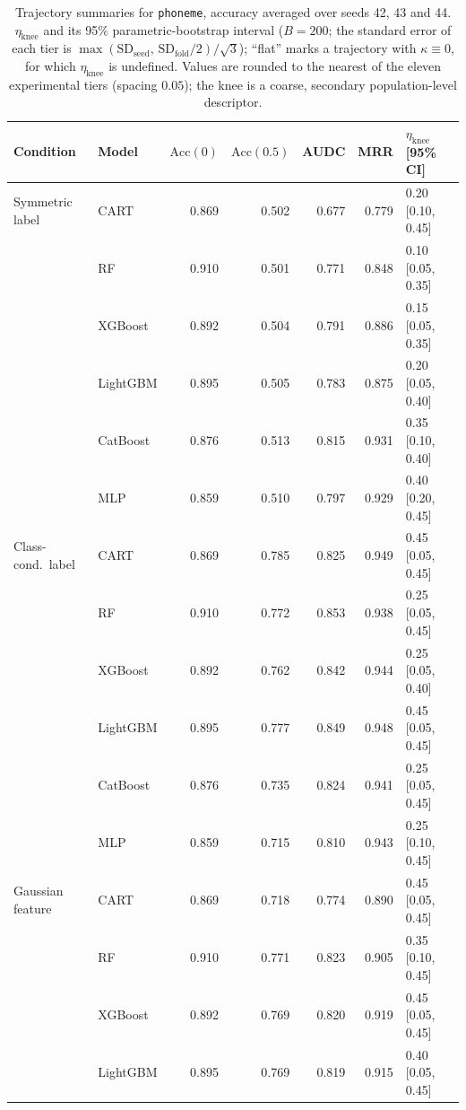 \begin{table}[p]
\centering
\scriptsize
\setlength{\tabcolsep}{3.5pt}
\caption{Trajectory summaries for \texttt{phoneme}, accuracy averaged over seeds 42, 43 and 44. $\eta_{\mathrm{knee}}$ and its 95\% parametric-bootstrap interval ($B=200$; the standard error of each tier is $\max(\mathrm{SD}_{\mathrm{seed}},\,\mathrm{SD}_{\mathrm{fold}}/2)/\sqrt3$); ``flat'' marks a trajectory with $\kappa\equiv 0$, for which $\eta_{\mathrm{knee}}$ is undefined. Values are rounded to the nearest of the eleven experimental tiers (spacing $0.05$); the knee is a coarse, secondary population-level descriptor.}
\label{tab:traj_phoneme}
\begin{tabular}{@{}llrrrrl@{}}
\toprule
Condition & Model & $\mathrm{Acc}(0)$ & $\mathrm{Acc}(0.5)$ & AUDC & MRR & $\eta_{\mathrm{knee}}$ [95\% CI] \\
\midrule
Symmetric label & CART & 0.869 & 0.502 & 0.677 & 0.779 & 0.20 [0.10, 0.45] \\
 & RF & 0.910 & 0.501 & 0.771 & 0.848 & 0.10 [0.05, 0.35] \\
 & XGBoost & 0.892 & 0.504 & 0.791 & 0.886 & 0.15 [0.05, 0.35] \\
 & LightGBM & 0.895 & 0.505 & 0.783 & 0.875 & 0.20 [0.05, 0.40] \\
 & CatBoost & 0.876 & 0.513 & 0.815 & 0.931 & 0.35 [0.10, 0.40] \\
 & MLP & 0.859 & 0.510 & 0.797 & 0.929 & 0.40 [0.20, 0.45] \\
\midrule
Class-cond.\ label & CART & 0.869 & 0.785 & 0.825 & 0.949 & 0.45 [0.05, 0.45] \\
 & RF & 0.910 & 0.772 & 0.853 & 0.938 & 0.25 [0.05, 0.45] \\
 & XGBoost & 0.892 & 0.762 & 0.842 & 0.944 & 0.25 [0.05, 0.40] \\
 & LightGBM & 0.895 & 0.777 & 0.849 & 0.948 & 0.45 [0.05, 0.45] \\
 & CatBoost & 0.876 & 0.735 & 0.824 & 0.941 & 0.25 [0.05, 0.45] \\
 & MLP & 0.859 & 0.715 & 0.810 & 0.943 & 0.25 [0.10, 0.45] \\
\midrule
Gaussian feature & CART & 0.869 & 0.718 & 0.774 & 0.890 & 0.45 [0.05, 0.45] \\
 & RF & 0.910 & 0.771 & 0.823 & 0.905 & 0.35 [0.10, 0.45] \\
 & XGBoost & 0.892 & 0.769 & 0.820 & 0.919 & 0.45 [0.05, 0.45] \\
 & LightGBM & 0.895 & 0.769 & 0.819 & 0.915 & 0.40 [0.05, 0.45] \\

\end{tabular}
\end{table}
